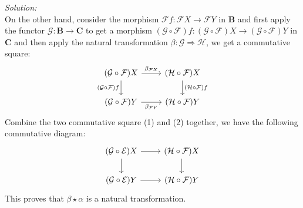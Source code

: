 \documentclass[a4paper, 12pt]{article}
\newenvironment{solution}
    {\textit{Solution:}}
    {}
\begin{document}
\begin{solution}
\begin{equation}
\end{equation}
On the other hand, consider the morphism \(\mathcal{F}f:\mathcal{F}X\rightarrow \mathcal{F}Y\) in \(\mathbf{B}\) and first apply the functor \(\mathcal{G}:\mathbf{B}\rightarrow \mathbf{C}\) to get a 
morphism \((\mathcal{G}\circ \mathcal{F})f:(\mathcal{G}\circ \mathcal{F})X\rightarrow (\mathcal{G}\circ \mathcal{F})Y\) in \(\mathbf{C}\) and then apply the natural transformation \(\beta:\mathcal{G}\Rightarrow \mathcal{H}\), we get a 
commutative square: 
\begin{equation}
\begin{tikzcd}
	{(\mathcal{G}\circ\mathcal{F})X} & {(\mathcal{H}\circ\mathcal{F})X} \\
	{(\mathcal{G}\circ\mathcal{F})Y} & {(\mathcal{H}\circ\mathcal{F})Y}
	\arrow["{\beta_{\mathcal{F}X}}", from=1-1, to=1-2]
	\arrow["{(\mathcal{G}\circ\mathcal{F})f}"', from=1-1, to=2-1]
	\arrow["{(\mathcal{H}\circ\mathcal{F})f}", from=1-2, to=2-2]
	\arrow["{\beta_{\mathcal{F}Y}}"', from=2-1, to=2-2]
\end{tikzcd}
\end{equation}
Combine the two commutative square (1) and (2) together, we have the following commutative diagram: 
$$\begin{tikzcd}
	{(\mathcal{G}\circ\mathcal{E})X} & {(\mathcal{H}\circ\mathcal{F})X} \\
	{(\mathcal{G}\circ\mathcal{E})Y} & {(\mathcal{H}\circ\mathcal{F})Y}
	\arrow[from=1-1, to=1-2]
	\arrow[from=1-1, to=2-1]
	\arrow[from=1-2, to=2-2]
	\arrow[from=2-1, to=2-2]
\end{tikzcd}$$
This proves that \(\beta\star \alpha\) is a natural transformation.
\end{solution}
\\ 
\end{document}
